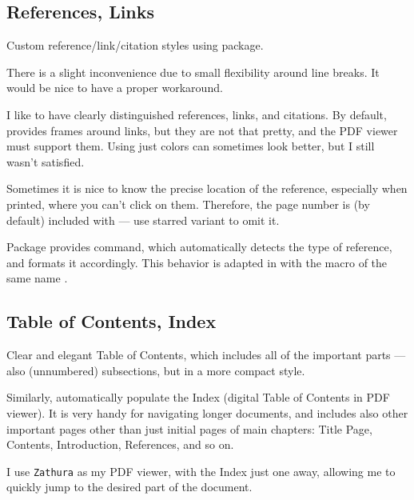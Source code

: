 \subsection{References, Links}%
\label{sub:References Links}

Custom reference/link/citation styles using  package.
\begin{Note}
    There is a slight inconvenience due to small flexibility around line breaks.
    It would be nice to have a proper workaround.
\end{Note}
\begin{remark}[Rationale]
    I like to have clearly distinguished references, links, and citations.
    By default,  provides frames around links, but they are not that pretty, and the PDF viewer must support them.
    Using just colors can sometimes look better, but I still wasn't satisfied.

    Sometimes it is nice to know the precise location of the reference, especially when printed, where you can't click on them.
    Therefore, the page number is (by default) included with \custommacro{\Cref} --- use starred variant \custommacro{\Cref*} to omit it.
\end{remark}
\begin{remark}
    Package  provides \macro{\Cref} command, which automatically detects the type of reference, and formats it accordingly.
    This behavior is adapted in \TeXtured{} with the macro of the same name \custommacro{\Cref}.
\end{remark}

\subsection{Table of Contents, Index}%
\label{sub:Table of Contents and Index}

Clear and elegant Table of Contents, which includes all of the important parts --- also (unnumbered) subsections, but in a more compact style.

Similarly, automatically populate the Index (digital Table of Contents in PDF viewer).
It is very handy for navigating longer documents, and includes also other important pages other than just initial pages of main chapters: Title Page, Contents, Introduction, References, and so on.
\begin{remark}
    I use \texttt{Zathura} as my PDF viewer, with the Index just one  away, allowing me to quickly jump to the desired part of the document.
\end{remark}


